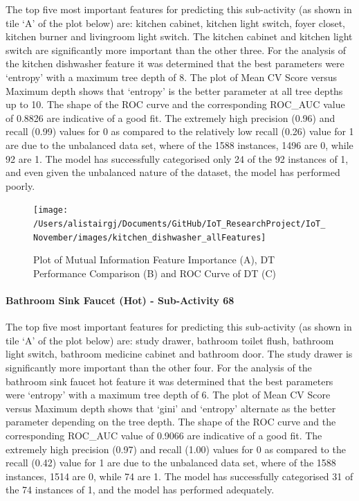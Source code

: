 \documentclass[11pt,]{article}
\let\oldparagraph\paragraph
\renewcommand{\paragraph}[1]{\oldparagraph{#1}\mbox{}}
\begin{document}
The top five most important features for predicting this sub-activity
(as shown in tile `A' of the plot below) are: kitchen cabinet, kitchen
light switch, foyer closet, kitchen burner and livingroom light switch.
The kitchen cabinet and kitchen light switch are significantly more
important than the other three. For the analysis of the kitchen
dishwasher feature it was determined that the best parameters were
`entropy' with a maximum tree depth of 8. The plot of Mean CV Score
versus Maximum depth shows that `entropy' is the better parameter at all
tree depths up to 10. The shape of the ROC curve and the corresponding
ROC\_AUC value of 0.8826 are indicative of a good fit. The extremely
high precision (0.96) and recall (0.99) values for 0 as compared to the
relatively low recall (0.26) value for 1 are due to the unbalanced data
set, where of the 1588 instances, 1496 are 0, while 92 are 1. The model
has successfully categorised only 24 of the 92 instances of 1, and even
given the unbalanced nature of the dataset, the model has performed
poorly.

\begin{figure}[H]

{\centering \texttt{[image: /Users/alistairgj/Documents/GitHub/IoT\_ResearchProject/IoT\_November/images/kitchen\_dishwasher\_allFeatures]} 

}

\caption{Plot of Mutual Information Feature Importance (A), DT Performance Comparison (B) and ROC Curve of DT (C)}\label{fig:unnamed-chunk-26}
\end{figure}

\hypertarget{bathroom-sink-faucet-hot---sub-activity-68-1}{%
\paragraph{Bathroom Sink Faucet (Hot) - Sub-Activity
68}\label{bathroom-sink-faucet-hot---sub-activity-68-1}}

The top five most important features for predicting this sub-activity
(as shown in tile `A' of the plot below) are: study drawer, bathroom
toilet flush, bathroom light switch, bathroom medicine cabinet and
bathroom door. The study drawer is significantly more important than the
other four. For the analysis of the bathroom sink faucet hot feature it
was determined that the best parameters were `entropy' with a maximum
tree depth of 6. The plot of Mean CV Score versus Maximum depth shows
that `gini' and `entropy' alternate as the better parameter depending on
the tree depth. The shape of the ROC curve and the corresponding
ROC\_AUC value of 0.9066 are indicative of a good fit. The extremely
high precision (0.97) and recall (1.00) values for 0 as compared to the
recall (0.42) value for 1 are due to the unbalanced data set, where of
the 1588 instances, 1514 are 0, while 74 are 1. The model has
successfully categorised 31 of the 74 instances of 1, and the model has
performed adequately.
\end{document}

